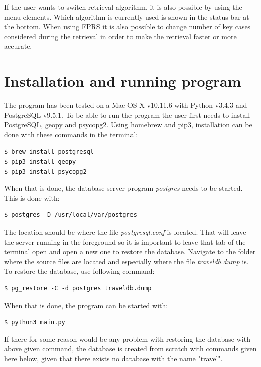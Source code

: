 \documentclass[12pt]{article}
\begin{document}
If the user wants to switch retrieval algorithm, it is also possible by using the menu elements. Which algorithm is currently used is shown in the status bar at the bottom. When using FPRS it is also possible to change number of key cases considered during the retrieval in order to make the retrieval faster or more accurate. 

\clearpage

\section{Installation and running program}
\label{sec:install}

The program has been tested on a Mac OS X v10.11.6 with Python v3.4.3 and PostgreSQL v9.5.1. To be able to run the program the user first needs to install PostgreSQL, geopy and psycopg2. Using homebrew and pip3, installation can be done with these commands in the terminal:

\begin{lstlisting}
$ brew install postgresql
$ pip3 install geopy
$ pip3 install psycopg2
\end{lstlisting}

When that is done, the database server program \textit{postgres} needs to be started. This is done with:

\begin{lstlisting}
$ postgres -D /usr/local/var/postgres
\end{lstlisting}

The location should be where the file \textit{postgresql.conf} is located. That will leave the server running in the foreground so it is important to leave that tab of the terminal open and open a new one to restore the database. Navigate to the folder where the source files are located and especially where the file \textit{traveldb.dump} is. To restore the database, use following command:

\begin{lstlisting}
$ pg_restore -C -d postgres traveldb.dump
\end{lstlisting}

When that is done, the program can be started with:

\begin{lstlisting}
$ python3 main.py
\end{lstlisting}

If there for some reason would be any problem with restoring the database with above given command, the database is created from scratch with commands given here below, given that there exists no database with the name "travel".
\end{document}
